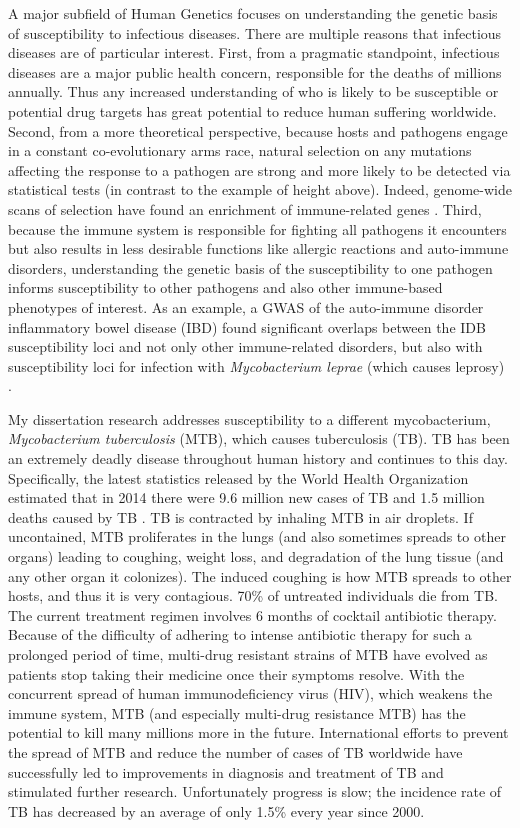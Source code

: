 A major subfield of Human Genetics focuses on understanding the
genetic basis of susceptibility to infectious diseases. There are
multiple reasons that infectious diseases are of particular
interest. First, from a pragmatic standpoint, infectious diseases are
a major public health concern, responsible for the deaths of millions
annually. Thus any increased understanding of who is likely to be
susceptible or potential drug targets has great potential to reduce
human suffering worldwide. Second, from a more theoretical
perspective, because hosts and pathogens engage in a constant
co-evolutionary arms race, natural selection on any mutations
affecting the response to a pathogen are strong and more likely to be
detected via statistical tests (in contrast to the example of height
above). Indeed, genome-wide scans of selection have found an
enrichment of immune-related genes \citep{Fumagalli2014}. Third,
because the immune system is responsible for fighting all pathogens it
encounters but also results in less desirable functions like allergic
reactions and auto-immune disorders, understanding the genetic basis
of the susceptibility to one pathogen informs susceptibility to other
pathogens and also other immune-based phenotypes of interest. As an
example, a GWAS of the auto-immune disorder inflammatory bowel disease
(IBD) found significant overlaps between the IDB susceptibility loci
and not only other immune-related disorders, but also with
susceptibility loci for infection with \emph{Mycobacterium leprae}
(which causes leprosy) \citep{Jostins2012}.

My dissertation research addresses susceptibility to a different
mycobacterium, \emph{Mycobacterium tuberculosis} (MTB), which causes
tuberculosis (TB). TB has been an extremely deadly disease throughout
human history and continues to this day. Specifically, the latest
statistics released by the World Health Organization estimated that in
2014 there were 9.6 million new cases of TB and 1.5 million deaths
caused by TB \citep{WHO2015a, WHO2015b}. TB is contracted by inhaling
MTB in air droplets. If uncontained, MTB proliferates in the lungs
(and also sometimes spreads to other organs) leading to coughing,
weight loss, and degradation of the lung tissue (and any other organ
it colonizes). The induced coughing is how MTB spreads to other hosts,
and thus it is very contagious. 70\% of untreated individuals die from
TB. The current treatment regimen involves 6 months of cocktail
antibiotic therapy. Because of the difficulty of adhering to intense
antibiotic therapy for such a prolonged period of time, multi-drug
resistant strains of MTB have evolved as patients stop taking their
medicine once their symptoms resolve. With the concurrent spread of
human immunodeficiency virus (HIV), which weakens the immune system,
MTB (and especially multi-drug resistance MTB) has the potential to
kill many millions more in the future. International efforts to
prevent the spread of MTB and reduce the number of cases of TB
worldwide have successfully led to improvements in diagnosis and
treatment of TB and stimulated further research. Unfortunately
progress is slow; the incidence rate of TB has decreased by an average
of only 1.5\% every year since 2000.

